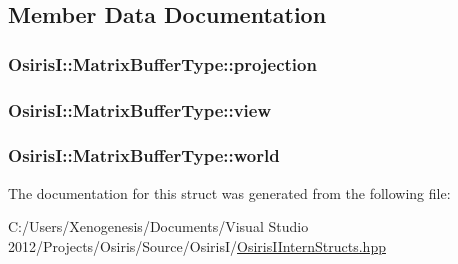 \subsection{Member Data Documentation}
\hypertarget{struct_osiris_i_1_1_matrix_buffer_type_a33f994911364411fd5cfd7201b4be475}{
\subsubsection[{projection}]{ Osiris\-I\-::\-Matrix\-Buffer\-Type\-::projection}}\label{struct_osiris_i_1_1_matrix_buffer_type_a33f994911364411fd5cfd7201b4be475}
\hypertarget{struct_osiris_i_1_1_matrix_buffer_type_aa768c418a4ff70da327bd736ecd413d3}{
\subsubsection[{view}]{ Osiris\-I\-::\-Matrix\-Buffer\-Type\-::view}}\label{struct_osiris_i_1_1_matrix_buffer_type_aa768c418a4ff70da327bd736ecd413d3}
\hypertarget{struct_osiris_i_1_1_matrix_buffer_type_aa0555ccdbe156b4ea24bac1ea1151e43}{
\subsubsection[{world}]{ Osiris\-I\-::\-Matrix\-Buffer\-Type\-::world}}\label{struct_osiris_i_1_1_matrix_buffer_type_aa0555ccdbe156b4ea24bac1ea1151e43}


The documentation for this struct was generated from the following file\-:\begin{DoxyCompactItemize}
\item 
C\-:/\-Users/\-Xenogenesis/\-Documents/\-Visual Studio 2012/\-Projects/\-Osiris/\-Source/\-Osiris\-I/\hyperlink{_osiris_i_intern_structs_8hpp}{Osiris\-I\-Intern\-Structs.\-hpp}\end{DoxyCompactItemize}
